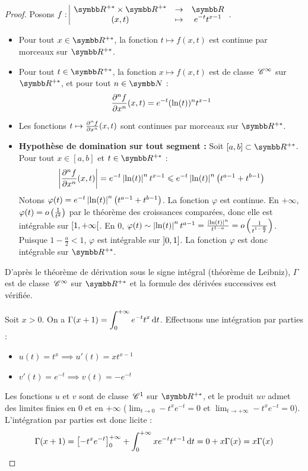 \begin{proof}
    
    \svspace Posons $\fonction{f}{\R^{+*} \times \R^{+*}}{\R}{(x,t)}{e^{-t}t^{x-1}}$.
    \begin{itemize}
        \item Pour tout $x \in \R^{+*}$, la fonction $t \mapsto f(x,t)$ est continue par morceaux sur $\R^{+*}$.
        \item Pour tout $t \in \R^{+*}$, la fonction $x \mapsto f(x,t)$ est de classe $\,\mathscr C^{\infty}$ sur $\R^{+*}$, et pour tout $n \in \N$ :
        \[ \frac{\partial^{n} f}{\partial x^{n}}(x,t) = e^{-t}(\ln(t))^n t^{x-1} \]
        \item Les fonctions $t \mapsto \frac{\partial^{n} f}{\partial x^{n}}(x,t)$ sont continues par morceaux sur $\R^{+*}$.
        \item \textbf{Hypothèse de domination sur tout segment :} Soit $[a,b] \subset \R^{+*}$. Pour tout $x \in [a,b]$ et $t \in \R^{+*}$ :
        \[ \left|\frac{\partial^{n} f}{\partial x^{n}}(x,t)\right| = e^{-t}\left|\ln(t)\right|^n t^{x-1} \leqslant e^{-t}\left|\ln(t)\right|^n \left(t^{a-1} + t^{b-1}\right) \]
        Notons $\varphi(t) = e^{-t}\left|\ln(t)\right|^n \left(t^{a-1} + t^{b-1}\right)$. La fonction $\varphi$ est continue.
        En $+\infty$, $\varphi(t) = o\left(\frac{1}{t^2}\right)$ par le théorème des croissances comparées, donc elle est intégrable sur $\left[1, +\infty\right[$.
        En $0$, $\varphi(t) \sim \left|\ln(t)\right|^n t^{a-1} = \frac{\left|\ln(t)\right|^n}{t^{1-a}} = o\left(\frac{1}{t^{1-\frac{a}{2}}}\right)$.
        Puisque $1 - \frac{a}{2} < 1$, $\varphi$ est intégrable sur $\left]0, 1\right]$.
        La fonction $\varphi$ est donc intégrable sur $\R^{+*}$.
    \end{itemize}
    D'après le théorème de dérivation sous le signe intégral (théorème de Leibniz), $\Gamma$ est de classe $\,\mathscr C^{\infty}$ sur $\R^{+*}$ et la formule des dérivées successives est vérifiée.

    
    \svspace Soit $x > 0$. On a $\Gamma(x+1) = \displaystyle\int_0^{+\infty} e^{-t} t^x \,\mathrm{d}t$.
    Effectuons une intégration par parties :
    \begin{itemize}
        \item $u(t) = t^x \implies u'(t) = x t^{x-1}$
        \item $v'(t) = e^{-t} \implies v(t) = -e^{-t}$
    \end{itemize}
    Les fonctions $u$ et $v$ sont de classe $\,\mathscr C^{1}$ sur $\R^{+*}$, et le produit $uv$ admet des limites finies en $0$ et en $+\infty$ ($\lim_{t\to 0} -t^x e^{-t} = 0$ et $\lim_{t\to+\infty} -t^x e^{-t} = 0$). L'intégration par parties est donc licite :
    \[ \Gamma(x+1) = \left[-t^x e^{-t}\right]_0^{+\infty} + \int_0^{+\infty} x e^{-t} t^{x-1} \,\mathrm{d}t = 0 + x \Gamma(x) = x \Gamma(x) \]


\end{proof}
